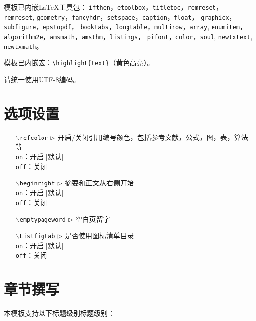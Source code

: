 模板已内嵌LaTeX工具包： 
 {\tt ifthen}，{\tt etoolbox}，{\tt titletoc}，{\tt remreset}，{\tt remreset}, 
 {\tt geometry}，{\tt fancyhdr}，{\tt setspace}，{\tt caption}，{\tt float}， 
 {\tt graphicx}，{\tt subfigure}，{\tt epstopdf}，
 {\tt book\-tabs}，{\tt longtable}，{\tt multirow}，{\tt array}, {\tt enumitem}， 
 {\tt algorithm2e}，{\tt amsmath}，{\tt amsthm}，{\tt listings}，
 {\tt pifont}，{\tt color}，{\tt soul}, {\tt newtxtext}, {\tt newtxmath}。

模板已内嵌宏：\verb|\highlight{text}|（黄色高亮）。

请统一使用UTF-8编码。



\section{选项设置}

\begin{itemize}[leftmargin=3cm]
  \item[{\tt  $\backslash$refcolor} $\triangleright$]  开启/关闭引用编号颜色，包括参考文献，公式，图，表，算法等\\
  \texttt{on}：开启 [默认]\\
  \texttt{off}：关闭
  \item[{\tt $\backslash$beginright} $\triangleright$]  摘要和正文从右侧开始\\
  \texttt{on}：开启 [默认]\\
  \texttt{off}：关闭
  \item[{\tt $\backslash$emptypageword} $\triangleright$]  空白页留字
  \item[{\tt $\backslash$Listfigtab} $\triangleright$]  是否使用图标清单目录\\
  \texttt{on}：开启 [默认]\\
  \texttt{off}：关闭
\end{itemize}


\section{章节撰写}
本模板支持以下标题级别标题级别：

